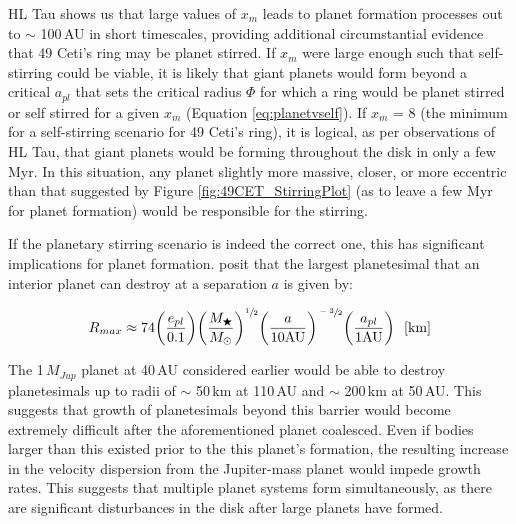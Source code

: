 HL Tau shows us that large values of $x_{m}$ leads to planet formation processes out to $\sim$ 100\,AU in short timescales, providing additional circumstantial evidence that 49 Ceti's ring may be planet stirred. If $x_{m}$ were large enough such that self-stirring could be viable, it is likely that giant planets would form beyond a critical $a_{pl}$ that sets the critical radius $\Phi$ for which a ring would be planet stirred or self stirred for a given $x_{m}$ (Equation \ref{eq:planetvself}). If $x_{m}$ = 8 (the minimum for a self-stirring scenario for 49 Ceti's ring), it is logical, as per observations of HL Tau, that giant planets would be forming throughout the disk in only a few Myr. In this situation, any planet slightly more massive, closer, or more eccentric than that suggested by Figure \ref{fig:49CET_StirringPlot} (as to leave a few Myr for planet formation) would be responsible for the stirring. 

If the planetary stirring scenario is indeed the correct one, this has significant implications for planet formation. \cite{Must09} posit that the largest planetesimal that an interior planet can destroy at a separation $a$ is given by:

\begin{equation}
\label{eq:planetDestruction}
R_{max} \approx 74 \bigg(\frac{e_{pl}}{0.1}\bigg) \bigg(\frac{M_{\bigstar}}{M_{\odot}}\bigg)^{\sfrac{1}{2}} \bigg(\frac{a}{10\text{AU}}\bigg)^{\sfrac{-3}{2}} \bigg(\frac{a_{pl}}{1\text{AU}}\bigg)~~[\text{km}]
\end{equation}

The 1\,$M_{Jup}$ planet at 40\,AU considered earlier would be able to destroy planetesimals up to radii of $\sim$ 50\,km at 110\,AU and $\sim$ 200\,km at 50\,AU. This suggests that growth of planetesimals beyond this barrier would become extremely difficult after the aforementioned planet coalesced. Even if bodies larger than this existed prior to the this planet's formation, the resulting increase in the velocity dispersion from the Jupiter-mass planet would impede growth rates. This suggests that multiple planet systems form simultaneously, as there are significant disturbances in the disk after large planets have formed. 

